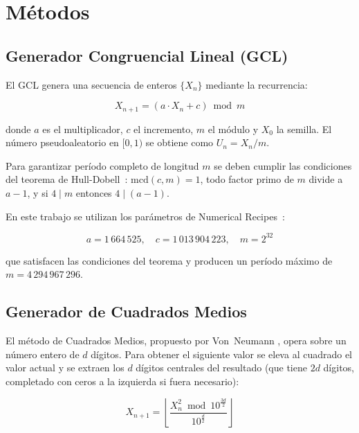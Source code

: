 \documentclass[a4paper, 11pt]{article}
\begin{document}
\section{Métodos}

\subsection{Generador Congruencial Lineal (GCL)}

El GCL genera una secuencia de enteros $\{X_n\}$ mediante la recurrencia:

\begin{equation}
  X_{n+1} = (a \cdot X_n + c) \bmod m
  \label{eq:gcl}
\end{equation}

donde $a$ es el multiplicador, $c$ el incremento, $m$ el módulo y $X_0$ la
semilla. El número pseudoaleatorio en $[0, 1)$ se obtiene como $U_n = X_n / m$.

Para garantizar período completo de longitud $m$ se deben cumplir las condiciones
del teorema de Hull-Dobell~\cite{knuth1997art}: $\text{mcd}(c, m) = 1$, todo factor
primo de $m$ divide a $a-1$, y si $4 \mid m$ entonces $4 \mid (a-1)$.

En este trabajo se utilizan los parámetros de Numerical Recipes~\cite{press1992numerical}:

\begin{equation}
  a = 1\,664\,525, \quad c = 1\,013\,904\,223, \quad m = 2^{32}
  \label{eq:gcl_params}
\end{equation}

que satisfacen las condiciones del teorema y producen un período máximo de
$m = 4\,294\,967\,296$.

\subsection{Generador de Cuadrados Medios}

El método de Cuadrados Medios, propuesto por Von~Neumann
\cite{vonneumann1951various}, opera sobre un número entero de $d$ dígitos.
Para obtener el siguiente valor se eleva al cuadrado el valor actual y se
extraen los $d$ dígitos centrales del resultado (que tiene $2d$ dígitos,
completado con ceros a la izquierda si fuera necesario):

\begin{equation}
  X_{n+1} = \left\lfloor \frac{X_n^2 \bmod 10^{\frac{3d}{2}}}{10^{\frac{d}{2}}} \right\rfloor
  \label{eq:cuad_medios}
\end{equation}
\end{document}
